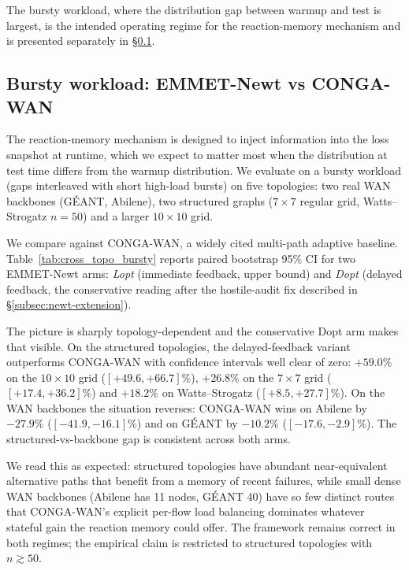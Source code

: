 The bursty workload, where the distribution gap between warmup
and test is largest, is the intended operating regime for the
reaction-memory mechanism and is presented separately in
\S\ref{subsec:bursty-cross-topology}.


\subsection{Bursty workload: EMMET-Newt vs CONGA-WAN}
\label{subsec:bursty-cross-topology}

The reaction-memory mechanism is designed to inject information into
the loss snapshot at runtime, which we expect to matter most when the
distribution at test time differs from the warmup distribution. We
evaluate on a bursty workload (gaps interleaved with short high-load
bursts) on five topologies: two real WAN backbones (GÉANT, Abilene),
two structured graphs ($7\times 7$ regular grid, Watts--Strogatz
$n{=}50$) and a larger $10\times 10$ grid.

We compare against CONGA-WAN, a widely cited multi-path adaptive
baseline. Table~\ref{tab:cross_topo_bursty} reports paired bootstrap
95\% CI for two EMMET-Newt arms: \emph{Lopt} (immediate feedback,
upper bound) and \emph{Dopt} (delayed feedback, the conservative
reading after the hostile-audit fix described in
\S\ref{subsec:newt-extension}).



The picture is sharply topology-dependent and the conservative Dopt
arm makes that visible. On the structured topologies, the
delayed-feedback variant outperforms CONGA-WAN with confidence
intervals well clear of zero: $+59.0\%$ on the $10\times 10$ grid
($[+49.6, +66.7]$\%), $+26.8\%$ on the $7\times 7$ grid
($[+17.4, +36.2]$\%) and $+18.2\%$ on Watts--Strogatz
($[+8.5, +27.7]$\%). On the WAN backbones the situation reverses:
CONGA-WAN wins on Abilene by $-27.9\%$ ($[-41.9, -16.1]$\%) and on
GÉANT by $-10.2\%$ ($[-17.6, -2.9]$\%). The structured-vs-backbone
gap is consistent across both arms.

We read this as expected: structured topologies have abundant
near-equivalent alternative paths that benefit from a memory of
recent failures, while small dense WAN backbones (Abilene has 11
nodes, GÉANT 40) have so few distinct routes that CONGA-WAN's
explicit per-flow load balancing dominates whatever stateful gain
the reaction memory could offer. The framework remains correct in
both regimes; the empirical claim is restricted to structured
topologies with $n \gtrsim 50$.



